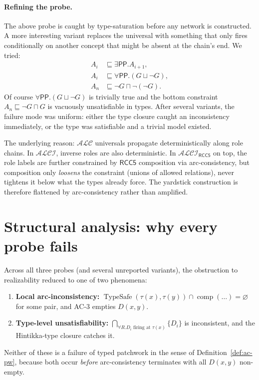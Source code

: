 \documentclass[11pt]{article}
\theoremstyle{definition}
\theoremstyle{remark}
\newcommand{\PP}{\mathsf{PP}}
\newcommand{\comp}{\operatorname{comp}}
\newcommand{\TypeSafe}{\operatorname{TypeSafe}}
\newcommand{\ALCIRCC}[1]{\mathcal{ALCI}_{\mathsf{RCC#1}}}
\begin{document}
\paragraph{Refining the probe.}  The above probe is caught by
type-saturation before any network is constructed.  A more
interesting variant replaces the universal with something that
only fires conditionally on another concept that might be absent
at the chain's end.  We tried:
\begin{align*}
  A_i &\sqsubseteq \exists \PP. A_{i+1}, \\
  A_i &\sqsubseteq \forall \PP. (G \sqcup \neg G), \\
  A_n &\sqsubseteq \neg G \sqcap \neg (\neg G).
\end{align*}
Of course $\forall \PP.(G \sqcup \neg G)$ is trivially true and the
bottom constraint $A_n \sqsubseteq \neg G \sqcap G$ is vacuously
unsatisfiable in types.  After several variants, the failure
mode was uniform: either the type closure caught an inconsistency
immediately, or the type was satisfiable and a trivial model
existed.

The underlying reason: $\mathcal{ALC}$ universals propagate
deterministically along role chains.  In $\mathcal{ALCI}$, inverse
roles are also deterministic.  In $\ALCIRCC{5}$ on top, the
role labels are further constrained by $\mathsf{RCC5}$ composition
via arc-consistency, but composition only \emph{loosens} the
constraint (unions of allowed relations), never tightens it below
what the types already force.  The yardstick construction is
therefore flattened by arc-consistency rather than amplified.

\section{Structural analysis: why every probe fails}
\label{sec:analysis}

Across all three probes (and several unreported variants), the
obstruction to realizability reduced to one of two phenomena:
\begin{enumerate}
  \item \textbf{Local arc-inconsistency:}
    $\TypeSafe(\tau(x), \tau(y)) \cap \comp(\ldots) = \varnothing$
    for some pair, and AC-3 empties $D(x,y)$.
  \item \textbf{Type-level unsatisfiability:}
    $\bigcap_{\forall R.D_i \text{ firing at } \tau(x)} \{D_i\}$
    is inconsistent, and the Hintikka-type closure catches it.
\end{enumerate}
Neither of these is a failure of typed patchwork in the sense of
Definition~\ref{def:ac-pw}, because both occur \emph{before}
arc-consistency terminates with all $D(x,y)$ non-empty.
\end{document}
